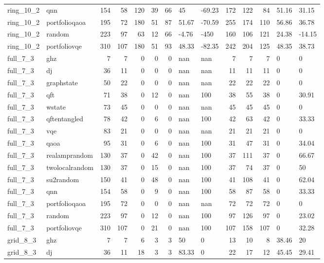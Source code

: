 \begin{longtable}{llrrrrrllrrrll}
ring\_10\_2 & qnn & 154 & 58 & 120 & 39 & 66 & 45 & -69.23 & 172 & 122 & 84 & 51.16 & 31.15 \\
ring\_10\_2 & portfolioqaoa & 195 & 72 & 180 & 51 & 87 & 51.67 & -70.59 & 255 & 174 & 110 & 56.86 & 36.78 \\
ring\_10\_2 & random & 223 & 97 & 63 & 12 & 66 & -4.76 & -450 & 160 & 106 & 121 & 24.38 & -14.15 \\
ring\_10\_2 & portfoliovqe & 310 & 107 & 180 & 51 & 93 & 48.33 & -82.35 & 242 & 204 & 125 & 48.35 & 38.73 \\
full\_7\_3 & ghz & 7 & 7 & 0 & 0 & 0 & nan & nan & 7 & 7 & 7 & 0 & 0 \\
full\_7\_3 & dj & 36 & 11 & 0 & 0 & 0 & nan & nan & 11 & 11 & 11 & 0 & 0 \\
full\_7\_3 & graphstate & 50 & 22 & 0 & 0 & 0 & nan & nan & 22 & 22 & 22 & 0 & 0 \\
full\_7\_3 & qft & 71 & 38 & 0 & 12 & 0 & nan & 100 & 38 & 55 & 38 & 0 & 30.91 \\
full\_7\_3 & wstate & 73 & 45 & 0 & 0 & 0 & nan & nan & 45 & 45 & 45 & 0 & 0 \\
full\_7\_3 & qftentangled & 78 & 42 & 0 & 6 & 0 & nan & 100 & 42 & 63 & 42 & 0 & 33.33 \\
full\_7\_3 & vqe & 83 & 21 & 0 & 0 & 0 & nan & nan & 21 & 21 & 21 & 0 & 0 \\
full\_7\_3 & qaoa & 95 & 31 & 0 & 6 & 0 & nan & 100 & 31 & 47 & 31 & 0 & 34.04 \\
full\_7\_3 & realamprandom & 130 & 37 & 0 & 42 & 0 & nan & 100 & 37 & 111 & 37 & 0 & 66.67 \\
full\_7\_3 & twolocalrandom & 130 & 37 & 0 & 15 & 0 & nan & 100 & 37 & 74 & 37 & 0 & 50 \\
full\_7\_3 & su2random & 150 & 41 & 0 & 48 & 0 & nan & 100 & 41 & 108 & 41 & 0 & 62.04 \\
full\_7\_3 & qnn & 154 & 58 & 0 & 9 & 0 & nan & 100 & 58 & 87 & 58 & 0 & 33.33 \\
full\_7\_3 & portfolioqaoa & 195 & 72 & 0 & 0 & 0 & nan & nan & 72 & 72 & 72 & 0 & 0 \\
full\_7\_3 & random & 223 & 97 & 0 & 12 & 0 & nan & 100 & 97 & 126 & 97 & 0 & 23.02 \\
full\_7\_3 & portfoliovqe & 310 & 107 & 0 & 21 & 0 & nan & 100 & 107 & 158 & 107 & 0 & 32.28 \\
grid\_8\_3 & ghz & 7 & 7 & 6 & 3 & 3 & 50 & 0 & 13 & 10 & 8 & 38.46 & 20 \\
grid\_8\_3 & dj & 36 & 11 & 18 & 3 & 3 & 83.33 & 0 & 22 & 17 & 12 & 45.45 & 29.41 \\

\end{longtable}
